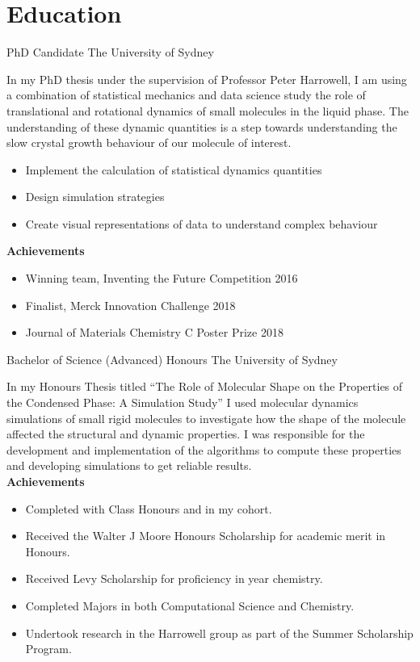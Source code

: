 



\makecvtitle{}

\vspace{-4em}
\section{Education}

{PhD Candidate}
{The University of Sydney}{}{}
{%
In my PhD thesis under the supervision of Professor Peter Harrowell,
I am using a combination of
statistical mechanics and data science
study the role of translational and rotational dynamics
of small molecules in the liquid phase.
The understanding of these dynamic quantities is a step
towards understanding the slow crystal growth behaviour of
our molecule of interest.
\begin{itemize}
  \item Implement the calculation of statistical dynamics quantities
  \item Design simulation strategies
  \item Create visual representations of data to understand complex behaviour
\end{itemize}
\textbf{Achievements}
\begin{itemize}
  \item Winning team, Inventing the Future Competition 2016
  \item Finalist, Merck Innovation Challenge 2018
  \item Journal of Materials Chemistry C Poster Prize 2018
\end{itemize}
}
\vspace{1em}


{Bachelor of Science (Advanced) Honours}
{The University of Sydney}{}{}
{%
In my Honours Thesis titled
``The Role of Molecular Shape on the Properties of the Condensed Phase: A Simulation Study''
I used molecular dynamics simulations of small rigid molecules to investigate how
the shape of the molecule affected the structural and dynamic properties.
I was responsible for the development and implementation of the algorithms to
compute these properties and developing simulations to get reliable results.\\
\textbf{Achievements}
\begin{itemize}
  \item Completed with  Class Honours and  in my cohort.
  \item Received the Walter J Moore Honours Scholarship for academic merit in Honours.
  \item Received Levy Scholarship for proficiency in  year chemistry.
  \item Completed Majors in both Computational Science and Chemistry.
  \item Undertook research in the Harrowell group as part of the Summer Scholarship Program.
\end{itemize}
}
\vspace{1em}

